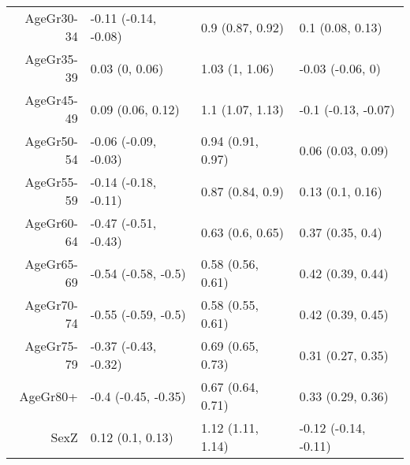 \begin{table}[ht]
\begin{tabular}{rlll}
  AgeGr30-34 & -0.11 (-0.14, -0.08) & 0.9 (0.87, 0.92) & 0.1 (0.08, 0.13) \\ 
  AgeGr35-39 & 0.03 (0, 0.06) & 1.03 (1, 1.06) & -0.03 (-0.06, 0) \\ 
  AgeGr45-49 & 0.09 (0.06, 0.12) & 1.1 (1.07, 1.13) & -0.1 (-0.13, -0.07) \\ 
  AgeGr50-54 & -0.06 (-0.09, -0.03) & 0.94 (0.91, 0.97) & 0.06 (0.03, 0.09) \\ 
  AgeGr55-59 & -0.14 (-0.18, -0.11) & 0.87 (0.84, 0.9) & 0.13 (0.1, 0.16) \\ 
  AgeGr60-64 & -0.47 (-0.51, -0.43) & 0.63 (0.6, 0.65) & 0.37 (0.35, 0.4) \\ 
  AgeGr65-69 & -0.54 (-0.58, -0.5) & 0.58 (0.56, 0.61) & 0.42 (0.39, 0.44) \\ 
  AgeGr70-74 & -0.55 (-0.59, -0.5) & 0.58 (0.55, 0.61) & 0.42 (0.39, 0.45) \\ 
  AgeGr75-79 & -0.37 (-0.43, -0.32) & 0.69 (0.65, 0.73) & 0.31 (0.27, 0.35) \\ 
  AgeGr80+ & -0.4 (-0.45, -0.35) & 0.67 (0.64, 0.71) & 0.33 (0.29, 0.36) \\ 
  SexZ & 0.12 (0.1, 0.13) & 1.12 (1.11, 1.14) & -0.12 (-0.14, -0.11) \\ 
   \hline
\end{tabular}
\end{table}
